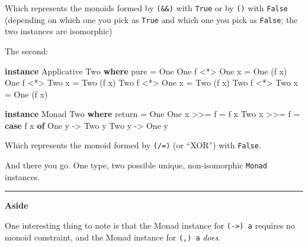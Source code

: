 \documentclass[]{article}
\newenvironment{Shaded}{}{}
\newcommand{\KeywordTok}[1]{\textcolor[rgb]{0.00,0.44,0.13}{\textbf{{#1}}}}
\newcommand{\DataTypeTok}[1]{\textcolor[rgb]{0.56,0.13,0.00}{{#1}}}
\newcommand{\OtherTok}[1]{\textcolor[rgb]{0.00,0.44,0.13}{{#1}}}
\newcommand{\FunctionTok}[1]{\textcolor[rgb]{0.02,0.16,0.49}{{#1}}}
\newcommand{\NormalTok}[1]{{#1}}
\begin{document}
Which represents the monoids formed by \texttt{(\&\&)} with \texttt{True} or by
\texttt{(\textbar{}\textbar{})} with \texttt{False} (depending on which one you
pick as \texttt{True} and which one you pick as \texttt{False}; the two
instances are isomorphic)

The second:

\begin{Shaded}
\begin{Highlighting}[]
\KeywordTok{instance} \DataTypeTok{Applicative} \DataTypeTok{Two} \KeywordTok{where}
    \NormalTok{pure }\FunctionTok{=} \DataTypeTok{One}
    \DataTypeTok{One} \NormalTok{f }\FunctionTok{<*>} \DataTypeTok{One} \NormalTok{x }\FunctionTok{=} \DataTypeTok{One} \NormalTok{(f x)}
    \DataTypeTok{One} \NormalTok{f }\FunctionTok{<*>} \DataTypeTok{Two} \NormalTok{x }\FunctionTok{=} \DataTypeTok{Two} \NormalTok{(f x)}
    \DataTypeTok{Two} \NormalTok{f }\FunctionTok{<*>} \DataTypeTok{One} \NormalTok{x }\FunctionTok{=} \DataTypeTok{Two} \NormalTok{(f x)}
    \DataTypeTok{Two} \NormalTok{f }\FunctionTok{<*>} \DataTypeTok{Two} \NormalTok{x }\FunctionTok{=} \DataTypeTok{One} \NormalTok{(f x)}

\KeywordTok{instance} \DataTypeTok{Monad} \DataTypeTok{Two} \KeywordTok{where}
    \NormalTok{return }\FunctionTok{=} \DataTypeTok{One}
    \DataTypeTok{One} \NormalTok{x }\FunctionTok{>>=} \NormalTok{f }\FunctionTok{=} \NormalTok{f x}
    \DataTypeTok{Two} \NormalTok{x }\FunctionTok{>>=} \NormalTok{f }\FunctionTok{=} \KeywordTok{case} \NormalTok{f x }\KeywordTok{of}
                    \DataTypeTok{One} \NormalTok{y }\OtherTok{->} \DataTypeTok{Two} \NormalTok{y}
                    \DataTypeTok{Two} \NormalTok{y }\OtherTok{->} \DataTypeTok{One} \NormalTok{y}
\end{Highlighting}
\end{Shaded}

Which represents the monoid formed by \texttt{(/=)} (or ``XOR'') with
\texttt{False}.

And there you go. One type, two possible unique, non-isomorphic \texttt{Monad}
instances.

\begin{center}\rule{0.5\linewidth}{\linethickness}\end{center}

\textbf{Aside}

One interesting thing to note is that the Monad instance for
\texttt{(-\textgreater{})\ a} requires no monoid constraint, and the Monad
instance for \texttt{(,)\ a} \emph{does}.
\end{document}
